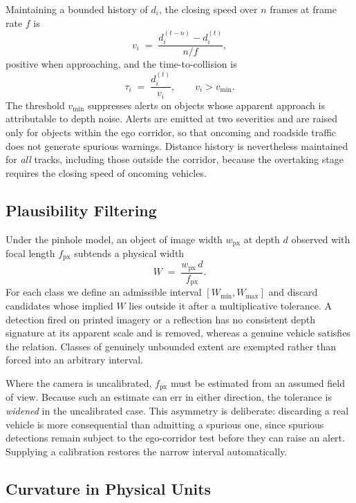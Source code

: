 \documentclass[conference]{IEEEtran}
\begin{document}
Maintaining a bounded history of $d_i$, the closing speed over $n$ frames at
frame rate $f$ is
\begin{equation}
  v_i \;=\; \frac{d_i^{(t-n)} - d_i^{(t)}}{n/f},
\end{equation}
positive when approaching, and the time-to-collision is
\begin{equation}
  \tau_i \;=\; \frac{d_i^{(t)}}{v_i}, \qquad v_i > v_{\min}.
\end{equation}
The threshold $v_{\min}$ suppresses alerts on objects whose apparent approach is
attributable to depth noise. Alerts are emitted at two severities and are raised
only for objects within the ego corridor, so that oncoming and roadside traffic
does not generate spurious warnings. Distance history is nevertheless maintained
for \textit{all} tracks, including those outside the corridor, because the
overtaking stage requires the closing speed of oncoming vehicles.

\subsection{Plausibility Filtering}
\label{sec:filter}

Under the pinhole model, an object of image width $w_{\mathrm{px}}$ at depth $d$
observed with focal length $f_{\mathrm{px}}$ subtends a physical width
\begin{equation}
  W \;=\; \frac{w_{\mathrm{px}}\, d}{f_{\mathrm{px}}}.
\end{equation}
For each class we define an admissible interval $[W_{\min}, W_{\max}]$ and
discard candidates whose implied $W$ lies outside it after a multiplicative
tolerance. A detection fired on printed imagery or a reflection has no
consistent depth signature at its apparent scale and is removed, whereas a
genuine vehicle satisfies the relation. Classes of genuinely unbounded extent
are exempted rather than forced into an arbitrary interval.

Where the camera is uncalibrated, $f_{\mathrm{px}}$ must be estimated from an
assumed field of view. Because such an estimate can err in either direction, the
tolerance is \textit{widened} in the uncalibrated case. This asymmetry is
deliberate: discarding a real vehicle is more consequential than admitting a
spurious one, since spurious detections remain subject to the ego-corridor test
before they can raise an alert. Supplying a calibration restores the narrow
interval automatically.

\subsection{Curvature in Physical Units}
\end{document}
